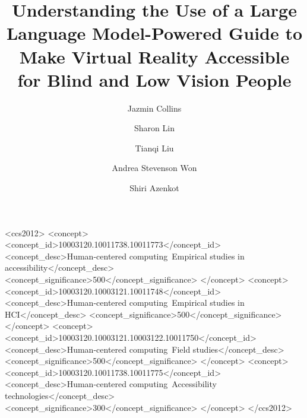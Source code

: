 \documentclass[sigconf]{acmart}
\begin{document}

\title{Understanding the Use of a Large Language Model-Powered Guide to Make Virtual Reality Accessible for Blind and Low Vision People}

\author{Jazmin Collins}




\author{Sharon Lin}

\author{Tianqi Liu}

\author{Andrea Stevenson Won}


\author{Shiri Azenkot}



\renewcommand{\shortauthors}{Collins et al.}





\begin{CCSXML}
<ccs2012>
   <concept>
       <concept_id>10003120.10011738.10011773</concept_id>
       <concept_desc>Human-centered computing~Empirical studies in accessibility</concept_desc>
       <concept_significance>500</concept_significance>
       </concept>
   <concept>
       <concept_id>10003120.10003121.10011748</concept_id>
       <concept_desc>Human-centered computing~Empirical studies in HCI</concept_desc>
       <concept_significance>500</concept_significance>
       </concept>
   <concept>
       <concept_id>10003120.10003121.10003122.10011750</concept_id>
       <concept_desc>Human-centered computing~Field studies</concept_desc>
       <concept_significance>500</concept_significance>
       </concept>
          <concept>
       <concept_id>10003120.10011738.10011775</concept_id>
       <concept_desc>Human-centered computing~Accessibility technologies</concept_desc>
       <concept_significance>300</concept_significance>
       </concept>
 </ccs2012>
\end{CCSXML}
\end{document}
